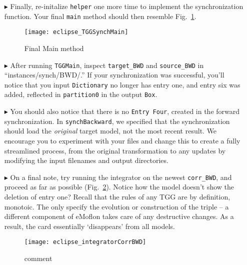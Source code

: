 \begin{itemize}
\item[$\blacktriangleright$] Finally, re-initalize \texttt{helper} one more time to implement the synchronization function. Your final \texttt{main} method
should then resemble Fig.~\ref{eclipse:TGGSynchMain}.

\begin{figure}[htbp]
\begin{center}
  \texttt{[image: eclipse\_TGGSynchMain]}
  \caption{Final Main method}
  \label{eclipse:TGGSynchMain}
\end{center}
\end{figure}

\item[$\blacktriangleright$] After running \texttt{TGGMain}, inspect \texttt{target\_BWD} and \texttt{source\_BWD} in ``instances/synch/BWD/.'' If your
synchronization was successful, you'll notice that you input \texttt{Dictionary} no longer has entry one, and entry six was added, reflected in
\texttt{partition0} in the output \texttt{Box}. 

\item[$\blacktriangleright$] You should also notice that there is no \texttt{Entry Four}, created in the forward synchronization. In \texttt{synchBackward}, we
specified that the synchronization should load the \emph{original} target model, not the most recent result. We encourage you to experiment with your files and
change this to create a fully streamlined process, from the original transformation to any updates by modifying the input filenames and output
directories.

\newpage

\item[$\blacktriangleright$] On a final note, try running the integrator on the newest \texttt{corr\_BWD}, and proceed as far as possible
(Fig.~\ref{eclipse:synchBwdIntegrator}). Notice how the model doesn't show the deletion of entry one? Recall that the rules of any TGG are by definition,
monotoic. The only specify the evolution or construction of the triple -- a different component of eMoflon takes care of any destructive changes. As a result,
the card essentially `disappears' from all models.

\begin{figure}[htbp]
\begin{center}
  \texttt{[image: eclipse\_integratorCorrBWD]}
  \caption{comment}
  \label{eclipse:synchBwdIntegrator}
\end{center}
\end{figure}

\end{itemize}
